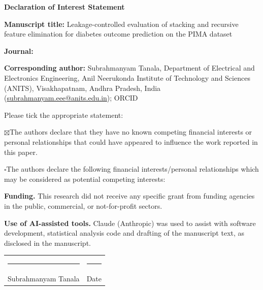\documentclass[11pt]{article}
\begin{document}
{\Large\bfseries Declaration of Interest Statement}

\textbf{Manuscript title:} Leakage-controlled evaluation of stacking and recursive feature elimination for diabetes outcome prediction on the PIMA dataset

\textbf{Journal:} \targetjournal

\textbf{Corresponding author:} Subrahmanyam Tanala, Department of Electrical and Electronics Engineering, Anil Neerukonda Institute of Technology and Sciences (ANITS), Visakhapatnam, Andhra Pradesh, India (\href{mailto:subrahmanyam.eee@anits.edu.in}{subrahmanyam.eee@anits.edu.in}); ORCID \href{https://orcid.org/\authororcid}{\authororcid}

\bigskip
Please tick the appropriate statement:

$\boxtimes$\quad The authors declare that they have no known competing financial interests or personal relationships that could have appeared to influence the work reported in this paper.

$\square$\quad The authors declare the following financial interests/personal relationships which may be considered as potential competing interests:

\bigskip
\textbf{Funding.} This research did not receive any specific grant from funding agencies in the public, commercial, or not-for-profit sectors.

\textbf{Use of AI-assisted tools.} Claude (Anthropic) was used to assist with software development, statistical analysis code and drafting of the manuscript text, as disclosed in the manuscript.

\vspace{2cm}
\begin{tabular}{@{}p{7cm}p{6cm}@{}}
\rule{6cm}{0.4pt} & \rule{5cm}{0.4pt} \\
Subrahmanyam Tanala & Date
\end{tabular}
\end{document}
